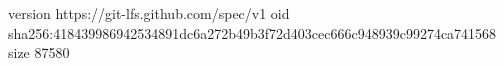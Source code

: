 version https://git-lfs.github.com/spec/v1
oid sha256:418439986942534891dc6a272b49b3f72d403cec666c948939c99274ca741568
size 87580

